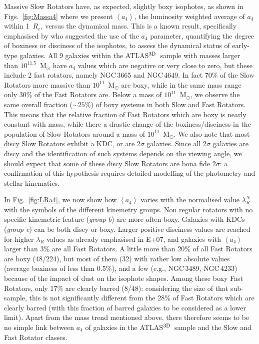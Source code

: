 \documentclass[useAMS,usenatbib,usegraphicx]{mn2e}
\newcommand{\atlas}{{ATLAS$^{\rm 3D}$}}
\begin{document}
Massive Slow Rotators have, as expected, slightly boxy isophotes, as shown
in Figs.~\ref{fig:Massa4} where we present $\left< a_4 \right>$, the luminosity weighted average of $a_4$
within 1~$R_e$, versus the dynamical mass. This is a
known result, specifically emphasised by \cite{KB96} who suggested the use of
the $a_4$ parameter, quantifying the degree of boxiness or disciness of the
isophotes, to assess the dynamical status of early-type galaxies. 
All 9 galaxies within the \atlas\ sample with masses larger than $10^{11.5}$~M$_{\odot}$
have $a_4$ values which are negative or very close to zero, but these include 2 fast
rotators, namely NGC\,3665 and NGC\,4649. In fact 70\% of the Slow Rotators more massive 
than $10^{11}$~M$_{\odot}$ are boxy, while in the same mass range only 30\% of the Fast Rotators are.
Below a mass of $10^{11}$~M$_{\odot}$, we observe the same overall fraction
($\sim 25$\%) of boxy systems in both Slow and Fast Rotators.
This means that the relative fraction of Fast Rotators which are boxy is nearly constant
with mass, while there a drastic change of the boxiness/disciness in the
population of Slow Rotators around a mass of $10^{11}$~M$_{\odot}$.
We also note that most discy Slow Rotators exhibit a KDC,
or are 2$\sigma$ galaxies. Since all 2$\sigma$ galaxies are discy and 
the identification of such systems depends on the viewing angle, we should
expect that some of these discy Slow Rotators are bona fide 2$\sigma$:
a confirmation of this hypothesis requires detailed 
modelling of the photometry and stellar kinematics.

In Fig.~\ref{fig:LRa4}, we now show how $\left< a_4 \right>$ varies with the normalised value $\lambda_R^N$ with
the symbols of the different kinemetry groups. Non regular rotators with no specific kinemetric feature
({\em group b}) are more often boxy. Galaxies with KDCs ({\em group c}) can be both discy or boxy.
Larger positive disciness values are reached for higher $\lambda_R$ values 
as already emphasised in E+07, and galaxies with $\left< a_4 \right>$
larger than 3\% are all Fast Rotators. A little more than 20\% of all Fast
Rotators are boxy (48/224), but most of them (32) with rather low absolute values
(average boxiness of less than 0.5\%), and a few (e.g., NGC\,3489, NGC\,4233) 
because of the impact of dust on the isophote shapes. 
Among these boxy Fast Rotators, only 17\% are clearly barred (8/48): 
considering the size of that sub-sample, this is not significantly 
different from the 28\% of Fast Rotators which are clearly barred (with this fraction
of barred galaxies to be considered as a lower limit). 
Apart from the mass trend mentioned above, there therefore seems to be no 
simple link between $a_4$ of galaxies in the \atlas\ sample and the Slow and
Fast Rotator classes.
\end{document}

